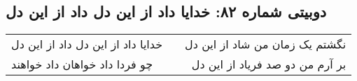 \begin{center}
\section*{دوبیتی شماره ۸۲: خدایا داد از این دل داد از این دل}
\label{sec:082}
\begin{longtable}{l p{0.5cm} r}
خدایا داد از این دل داد از این دل
&&
نگشتم یک زمان من شاد از این دل
\\
چو فردا داد خواهان داد خواهند
&&
بر آرم من دو صد فریاد از این دل
\\
\end{longtable}
\end{center}
